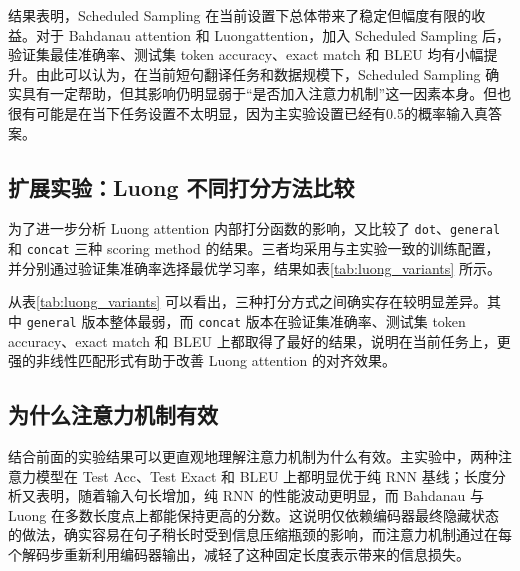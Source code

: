 \documentclass[a4paper]{article}
\begin{document}
结果表明，Scheduled Sampling 在当前设置下总体带来了稳定但幅度有限的收益。对于 Bahdanau attention 和 Luongattention，加入 Scheduled Sampling 后，验证集最佳准确率、测试集 token accuracy、exact match 和 BLEU 均有小幅提升。由此可以认为，在当前短句翻译任务和数据规模下，Scheduled Sampling 确实具有一定帮助，但其影响仍明显弱于“是否加入注意力机制”这一因素本身。但也很有可能是在当下任务设置不太明显，因为主实验设置已经有0.5的概率输入真答案。



\subsection{扩展实验：Luong 不同打分方法比较}
为了进一步分析 Luong attention 内部打分函数的影响，又比较了 \texttt{dot}、\texttt{general} 和 \texttt{concat} 三种 scoring method 的结果。三者均采用与主实验一致的训练配置，并分别通过验证集准确率选择最优学习率，结果如表\ref{tab:luong_variants} 所示。

\begin{table}[H]
    \centering
    \small
    \caption{Luong attention 不同打分方法的结果比较}
    \label{tab:luong_variants}
\end{table}

从表\ref{tab:luong_variants} 可以看出，三种打分方式之间确实存在较明显差异。其中 \texttt{general} 版本整体最弱，而 \texttt{concat} 版本在验证集准确率、测试集 token accuracy、exact match 和 BLEU 上都取得了最好的结果，说明在当前任务上，更强的非线性匹配形式有助于改善 Luong attention 的对齐效果。

\subsection{为什么注意力机制有效}
结合前面的实验结果可以更直观地理解注意力机制为什么有效。主实验中，两种注意力模型在 Test Acc、Test Exact 和 BLEU 上都明显优于纯 RNN 基线；长度分析又表明，随着输入句长增加，纯 RNN 的性能波动更明显，而 Bahdanau 与 Luong 在多数长度点上都能保持更高的分数。这说明仅依赖编码器最终隐藏状态的做法，确实容易在句子稍长时受到信息压缩瓶颈的影响，而注意力机制通过在每个解码步重新利用编码器输出，减轻了这种固定长度表示带来的信息损失。
\end{document}
